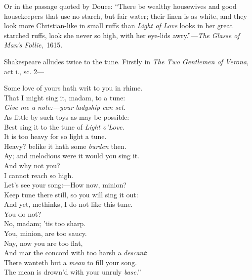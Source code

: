 Or in the passage quoted by Douce: “There be wealthy housewives and good
housekeepers that use no starch, but fair water; their linen is as white, and they
look more Christian-like in small ruffs than \textit{Light of Love} looks in her great
starched ruffs, look she never so high, with her eye-lids awry.”—\textit{The Glasse of
Man's Follie},~1615.

Shakespeare alludes twice to the tune. Firstly in \textit{The Two Gentlemen of Verona},
act i., sc. 2—

\begin{scverse}
Some love of yours hath writ to you in rhime.\\
That I might sing it, madam, to a tune:\\
\textit{Give me a note:—your ladyship can set}.\\
As little by such toys as may be possible:\\
Best sing it to the tune of \textit{Light o'Love}.\\
It is too heavy for so light a tune.\\
Heavy? belike it hath some \textit{burden} then.\\
Ay; and melodious were it would you sing it.\\
And why not you?\\
I cannot reach so high.\\
Let’s see your song:—How now, minion?\\
Keep tune there still, so you will sing it out:\\
And yet, methinks, I do not like this tune.\\
 You do not?\\
 No, madam; ’tis too sharp.\\
 You, minion, are too saucy.\\
 Nay, now you are too flat,\\
And mar the concord with too harsh a \textit{descant}:\\
There wanteth but a \textit{mean} to fill your song.\\
 The mean is drown’d with your unruly \textit{base}.’’
\end{scverse}

